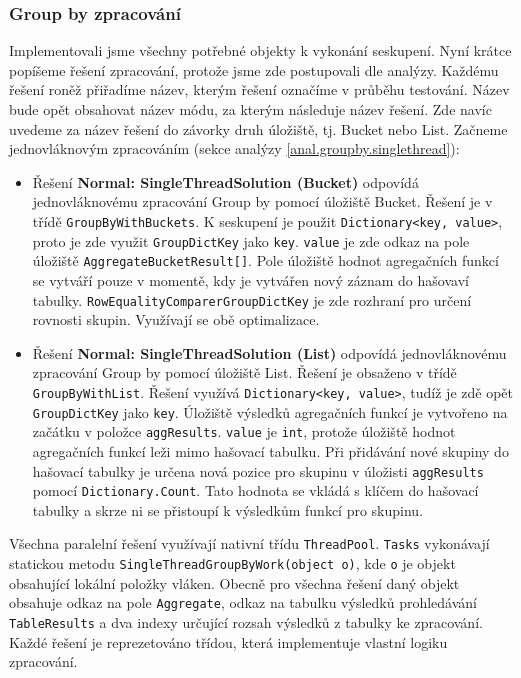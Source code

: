 \subsubsection{Group by zpracování}

Implementovali jsme všechny potřebné objekty k vykonání seskupení.
Nyní krátce popíšeme řešení zpracování, protože jsme zde postupovali dle analýzy.
Každému řešení roněž přiřadíme název, kterým řešení označíme v průběhu testování.
Název bude opět obsahovat název módu, za kterým následuje název řešení.
Zde navíc uvedeme za název řešení do závorky druh úložiště, tj. Bucket nebo List.
Začneme jednovláknovým zpracováním (sekce analýzy \ref{anal.groupby.singlethread}):
\begin{itemize}

\item Řešení \textbf{Normal: SingleThreadSolution (Bucket)} odpovídá jednovláknovému zpracování Group by pomocí úložiště Bucket.
Řešení je v třídě \texttt{GroupByWithBuckets}.
K seskupení je použit \texttt{Dictionary<key, value>}, proto je zde využit \texttt{GroupDictKey} jako \texttt{key}.
\texttt{value} je zde odkaz na pole úložiště \texttt{AggregateBucketResult[]}.
Pole úložiště hodnot agregačních funkcí se vytváří pouze v momentě, kdy je vytvářen nový záznam do hašovaví tabulky.
\texttt{RowEqualityComparerGroupDictKey} je zde rozhraní pro určení rovnosti skupin.
Využívají se obě optimalizace.

\item  Řešení \textbf{Normal: SingleThreadSolution (List)} odpovídá jednovláknovému zpracování Group by pomocí úložiště List.
Řešení je obsaženo v třídě \texttt{GroupByWithList}.
Řešení využívá \texttt{Dictionary<key, value>}, tudíž je zdě opět \texttt{GroupDictKey} jako \texttt{key}.
Úložiště výsledků agregačních funkcí je vytvořeno na začátku v položce \texttt{aggResults}.
\texttt{value} je \texttt{int}, protože úložiště hodnot agregačních funkcí leži mimo hašovací tabulku.
Při přidávání nové skupiny do hašovací tabulky je určena nová pozice pro skupinu v úložisti \texttt{aggResults} pomocí \texttt{Dictionary.Count}.
Tato hodnota se vkládá s klíčem do hašovací tabulky a skrze ni se přistoupí k výsledkům funkcí pro skupinu.
\end{itemize}
Všechna paralelní řešení využívají nativní třídu \texttt{ThreadPool}.
\texttt{Tasks} vykonávají statickou metodu \texttt{SingleThreadGroupByWork(object o)}, kde \texttt{o} je objekt obsahující lokální položky vláken.
Obecně pro všechna řešení daný objekt obsahuje odkaz na pole \texttt{Aggregate}, odkaz na tabulku výsledků prohledávání \texttt{TableResults} a dva indexy určující rozsah výsledků z tabulky ke zpracování.
Každé řešení je reprezetováno třídou, která implementuje vlastní logiku zpracování.

